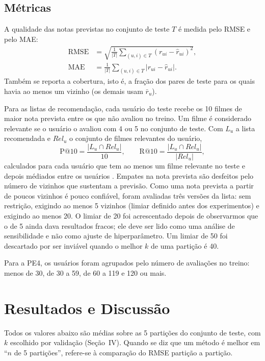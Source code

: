 \documentclass[conference]{IEEEtran}
\begin{document}
\subsection{M\'etricas}
A qualidade das notas previstas no conjunto de teste $T$ \'e medida pelo RMSE e pelo MAE:
\begin{align}
\mathrm{RMSE}&=\sqrt{\frac{1}{|T|}\sum_{(u,i)\in T}(r_{ui}-\hat{r}_{ui})^2},\\
\mathrm{MAE}&=\frac{1}{|T|}\sum_{(u,i)\in T}|r_{ui}-\hat{r}_{ui}|.
\end{align}
Tamb\'em se reporta a cobertura, isto \'e, a fra\c{c}\~ao dos pares de teste para os quais havia ao menos um vizinho (os demais usam $\bar{r}_u$).

Para as listas de recomenda\c{c}\~ao, cada usu\'ario do teste recebe os 10 filmes de maior nota prevista entre os que n\~ao avaliou no treino. Um filme \'e considerado relevante se o usu\'ario o avaliou com 4 ou 5 no conjunto de teste. Com $L_u$ a lista recomendada e $\mathit{Rel}_u$ o conjunto de filmes relevantes do usu\'ario,
\begin{equation}
\mathrm{P@10}=\frac{|L_u\cap \mathit{Rel}_u|}{10},\qquad \mathrm{R@10}=\frac{|L_u\cap \mathit{Rel}_u|}{|\mathit{Rel}_u|},
\end{equation}
calculados para cada usu\'ario que tem ao menos um filme relevante no teste e depois m\'ediados entre os usu\'arios \cite{shani2011}. Empates na nota prevista s\~ao desfeitos pelo n\'umero de vizinhos que sustentam a previs\~ao. Como uma nota prevista a partir de poucos vizinhos \'e pouco confi\'avel, foram avaliadas tr\^es vers\~oes da lista: sem restri\c{c}\~ao, exigindo ao menos 5 vizinhos (limiar definido antes dos experimentos) e exigindo ao menos 20. O limiar de 20 foi acrescentado depois de observarmos que o de 5 ainda dava resultados fracos; ele deve ser lido como uma an\'alise de sensibilidade e n\~ao como ajuste de hiperpar\^ametro. Um limiar de 50 foi descartado por ser invi\'avel quando o melhor $k$ de uma parti\c{c}\~ao \'e 40.

Para a PE4, os usu\'arios foram agrupados pelo n\'umero de avalia\c{c}\~oes no treino: menos de 30, de 30 a 59, de 60 a 119 e 120 ou mais.

\section{Resultados e Discuss\~ao}
Todos os valores abaixo s\~ao m\'edias sobre as 5 parti\c{c}\~oes do conjunto de teste, com $k$ escolhido por valida\c{c}\~ao (Se\c{c}\~ao~IV). Quando se diz que um m\'etodo \'e melhor em ``$n$ de 5 parti\c{c}\~oes'', refere-se \`a compara\c{c}\~ao do RMSE partição a partição.
\end{document}
